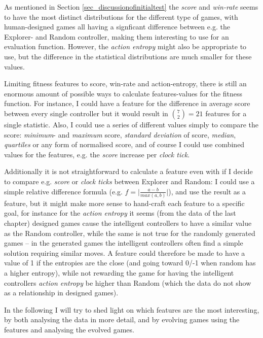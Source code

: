\documentclass[a4paper,titlepage,final]{report}
\begin{document}
As mentioned in Section \ref{sec_discussionofinitialtest} the \textit{score} and \textit{win-rate} seems to have the most distinct distributions for the different type of games, with human-designed games all having a signficant difference between e.g. the Explorer- and Random controller, making them interesting to use for an evaluation function.
However, the \textit{action entropy} might also be appropriate to use, but the difference in the statistical distributions are much smaller for these values.

Limiting fitness features to score, win-rate and action-entropy, there is still an enormous amount of possible ways to calculate features-values for the fitness function.
For instance, I could have a feature for the difference in average score between every single controller but it would result in $\binom{7}{2}=21$ features for a single statistic.
Also, I could use a series of different values simply to compare the score: \textit{minimum}- and \textit{maximum} score, \textit{standard deviation} of score, \textit{median}, \textit{quartiles} or any form of normalised score, and of course I could  use combined values for the features, e.g. the \textit{score} increase per \textit{clock tick}.

Additionally it is not straightforward to calculate a feature even with if I decide to compare e.g. \textit{score} or \textit{clock ticks} between Explorer and Random:
I could use a simple relative difference formula (e.g. $f=\lvert\frac{a-b}{max(a,b)}\rvert$), and use the result as a feature, but it might make more sense to hand-craft each feature to a specific goal, for instance for the \textit{action entropy} it seems (from the data of the last chapter) designed games cause the intelligent controllers to have a similar value as the Random controller, while the same is not true for the randomly generated games -- in the generated games the intelligent controllers often find a simple solution requiring similar moves.
A feature could therefore be made to have a value of 1 if the entropies are the close (and going toward 0/-1 when random has a higher entropy), while not rewarding the game for having the intelligent controllers \textit{action entropy} be higher than Random (which the data do not show as a relationship in designed games).

In the following I will try to shed light on which features are the most interesting, by both analysing the data in more detail, and by evolving games using the features and analysing the evolved games.
\end{document}
